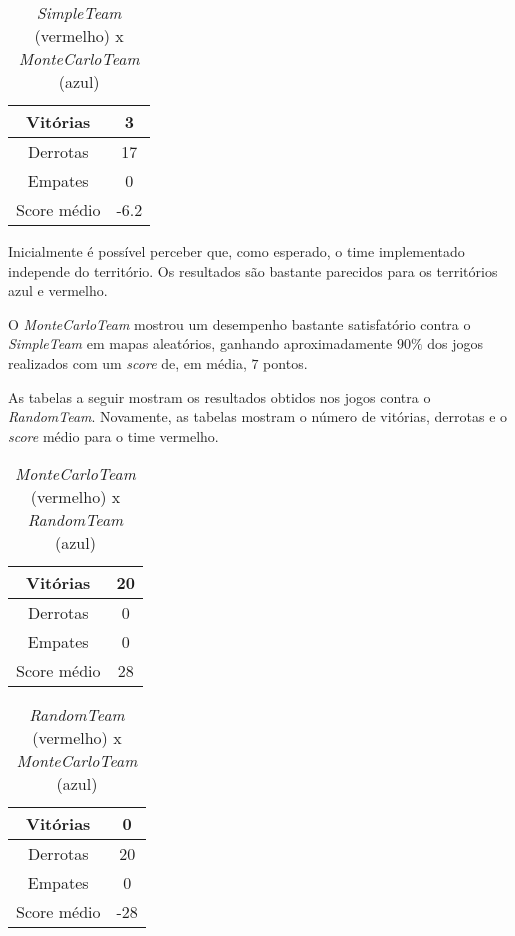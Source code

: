 \documentclass[a4paper,12pt]{article}
\begin{document}
\begin{table}[htb!]
    {\centering
    \begin{tabular}{|c|c|} \hline
    Vitórias     & 3    \\ \hline
    Derrotas     & 17   \\ \hline
    Empates      & 0    \\ \hline
    Score médio  & -6.2 \\ \hline
    \end{tabular}
    \caption{\textit{SimpleTeam} (vermelho) x \textit{MonteCarloTeam} (azul)}
    }
\end{table}

Inicialmente é possível perceber que, como esperado, o time implementado independe do
território. Os resultados são bastante parecidos para os territórios azul e vermelho.

O \textit{MonteCarloTeam} mostrou um desempenho bastante satisfatório contra o \textit{SimpleTeam}
em mapas aleatórios, ganhando aproximadamente $90\%$ dos jogos realizados com
um \textit{score} de, em média, $7$ pontos.

As tabelas a seguir mostram os resultados obtidos nos jogos contra o \textit{RandomTeam}.
Novamente, as tabelas mostram o número de vitórias, derrotas e o \textit{score} médio
para o time vermelho.

\begin{table}[htb!]
    {\centering
    \begin{tabular}{|c|c|} \hline
    Vitórias     & 20 \\ \hline
    Derrotas     & 0  \\ \hline
    Empates      & 0  \\ \hline
    Score médio  & 28 \\ \hline
    \end{tabular}
    \caption{\textit{MonteCarloTeam} (vermelho) x \textit{RandomTeam} (azul)}
    }
\end{table}

\begin{table}[htb!]
    {\centering
    \begin{tabular}{|c|c|} \hline
    Vitórias     & 0   \\ \hline
    Derrotas     & 20  \\ \hline
    Empates      & 0   \\ \hline
    Score médio  & -28 \\ \hline
    \end{tabular}
    \caption{\textit{RandomTeam} (vermelho) x \textit{MonteCarloTeam} (azul)}
    }
\end{table}
\end{document}

